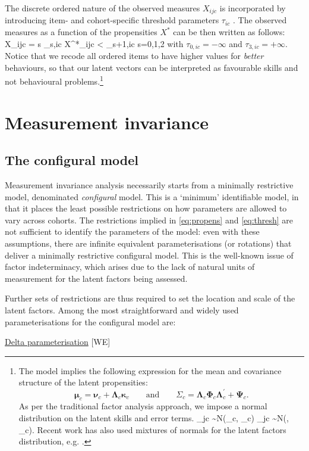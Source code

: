 The discrete ordered nature of the observed measures $X_{ijc}$ is incorporated by introducing item- and cohort-specific threshold parameters $\tau_{ic}$ \citep{Muthen1984}. The observed measures as a function of the propensities $X^*$ can be then written as follows:
\be\label{eq:thresh}
X_{ijc} = s \qquad {} \; \tau_{s,ic} \leq X^*_{ijc} < \tau_{s+1,ic} \qquad {} \; s=0,1,2
\ee
with $\tau_{0,ic}=-\infty$ and $\tau_{3,ic}=+\infty$. Notice that we recode all ordered items to have higher values for \emph{better} behaviours, so that our latent vectors can be interpreted as favourable skills and not behavioural problems.\footnote{The model implies the following expression for the mean and covariance structure of the latent propensities:
$$\bm{\mu}_c=\bm{\nu}_c + \bm{\Lambda}_c\bm{\kappa}_c \qquad \text{and} \qquad \Sigma_c = \bm{\Lambda}_c \bm{\Phi}_c \bm{\Lambda}_c^\prime + \bm{\Psi}_c.$$
As per the traditional factor analysis approach, we impose a normal distribution on the latent skills and error terms. 
\be\label{eq:norm}
\bm{\theta}_{jc} \sim N(\bm{\kappa}_c, \bm{\Phi}_c) \qquad {} \qquad {}_{jc} \sim N(, \bm{\Psi}_c).
\ee
Recent work has also used mixtures of normals for the latent factors distribution, e.g. \citet{Conti2010a}.}

\section{Measurement invariance \label{sec:measinv}}

\subsection{The configural model \label{sec:config}}

Measurement invariance analysis necessarily starts from a minimally restrictive model, denominated \emph{configural} model. This is a `minimum' identifiable model, in that it places the least possible restrictions on how parameters are allowed to vary across cohorts. The restrictions implied in \eqref{eq:propens} and \eqref{eq:thresh} are not sufficient to identify the parameters of the model: even with these assumptions, there are infinite equivalent parameterisations (or rotations) that deliver a minimally restrictive configural model. This is the well-known issue of factor indeterminacy, which arises due to the lack of natural units of measurement for the latent factors being assessed.

Further sets of restrictions are thus required to set the location and scale of the latent factors. Among the most straightforward and widely used parameterisations for the configural model are:
\bi[label=$\diamond$]
\item \underline{Delta parameterisation} {[WE{\textDelta}]} \citep{Wu2016a}

